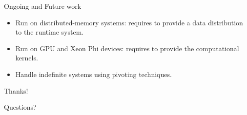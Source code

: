 \documentclass[unknownkeysallowed]{beamer}
\begin{document}
\begin{frame}{Ongoing and Future work}

  \begin{itemize}
  \item Run on \alert{distributed-memory} systems: requires to provide
    a data distribution to the runtime system.

    \vspace{0.4cm}

  \item Run on \alert{GPU} and \alert{Xeon Phi} devices: requires to provide
    the computational kernels.

    \vspace{0.4cm}

  \item Handle \alert{indefinite} systems using pivoting techniques.
  \end{itemize}

\end{frame}

\begin{frame}[plain]{}
  \begin{center}
    \vspace{2cm}

    {\Huge Thanks!}

    \vspace{1cm}

    {\huge Questions?}

    \vspace{2cm}

  \end{center}
\end{frame}
\end{document}
